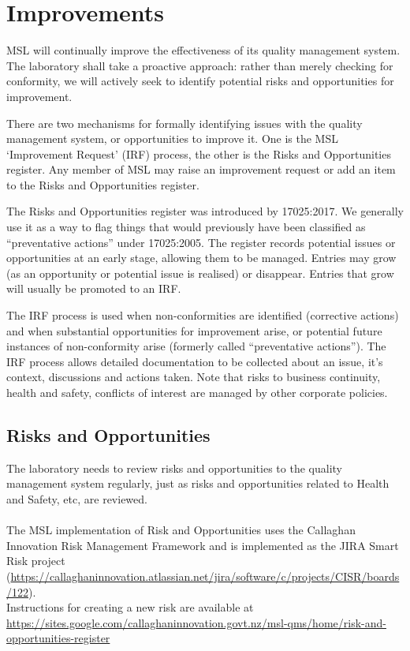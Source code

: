 \section{Improvements}
\label{s:improvements}
MSL will continually improve the effectiveness of its quality management system. The laboratory shall take a proactive approach: rather than merely checking for conformity, we will actively seek to identify potential risks and opportunities for improvement.

There are two mechanisms for formally identifying issues with the quality management system, or opportunities to improve it. One is the MSL ‘Improvement Request’ (IRF) process, the other is the Risks and Opportunities register. 
Any member of MSL may raise an improvement request or add an item to the Risks and Opportunities register. 

The Risks and Opportunities register was introduced by 17025:2017. We generally use it as a way to flag things that would previously have been classified as “preventative actions” under 17025:2005. The register records potential issues or opportunities at an early stage, allowing them to be managed. Entries may grow (as an opportunity or potential issue is realised) or disappear. Entries that grow will usually be promoted to an IRF.

The IRF process is used when non-conformities are identified (corrective actions) and when substantial opportunities for improvement arise, or potential future instances of non-conformity arise (formerly called “preventative actions”). The IRF process allows detailed documentation to be collected about an issue, it’s context, discussions and actions taken. 
Note that risks to business continuity, health and safety, conflicts of interest are managed by other corporate policies. 

\subsection{Risks and Opportunities}
The laboratory needs to review risks and opportunities to the quality management system regularly, just as risks and opportunities related to Health and Safety, etc, are reviewed. \\
\\
The MSL implementation of Risk and Opportunities uses the Callaghan Innovation Risk Management Framework and is implemented as the JIRA Smart Risk project (\url{https://callaghaninnovation.atlassian.net/jira/software/c/projects/CISR/boards/122}). \\
Instructions for creating a new risk are available at \url{https://sites.google.com/callaghaninnovation.govt.nz/msl-qms/home/risk-and-opportunities-register}

